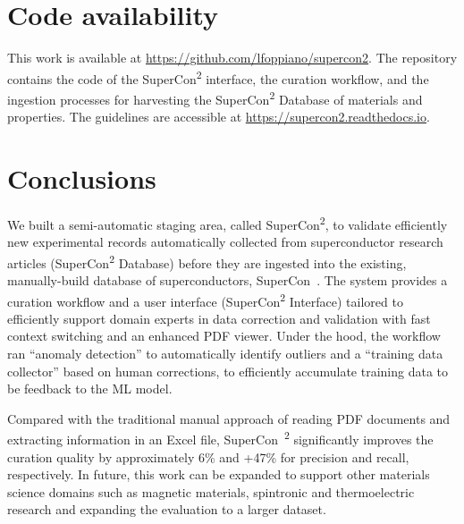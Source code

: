 \documentclass[]{interact}
\theoremstyle{plain} %
\theoremstyle{definition}
\theoremstyle{remark}
\begin{document}
\section{Code availability}
This work is available at \url{https://github.com/lfoppiano/supercon2}. The repository contains the code of the SuperCon\textsuperscript{2} interface, the curation workflow, and the ingestion processes for harvesting the SuperCon\textsuperscript{2} Database of materials and properties. The guidelines are accessible at \url{https://supercon2.readthedocs.io}.

\section{Conclusions}
We built a semi-automatic staging area, called SuperCon\textsuperscript{2}, to validate efficiently new experimental records automatically collected from superconductor research articles (SuperCon\textsuperscript{2} Database) before they are ingested into the existing, manually-build database of superconductors, SuperCon~\cite{ishii2023structuring}.
The system provides a curation workflow and a user interface (SuperCon\textsuperscript{2} Interface) tailored to efficiently support domain experts in data correction and validation with fast context switching and an enhanced PDF viewer.
Under the hood, the workflow ran ``anomaly detection'' to automatically identify outliers and a ``training data collector'' based on human corrections, to efficiently accumulate training data to be feedback to the ML model. 

Compared with the traditional manual approach of reading PDF documents and extracting information in an Excel file, SuperCon~\textsuperscript{2} significantly improves the curation quality by approximately 6\% and +47\% for precision and recall, respectively.
In future, this work can be expanded to support other materials science domains such as magnetic materials, spintronic and thermoelectric research and expanding the evaluation to a larger dataset. 


\end{document}
